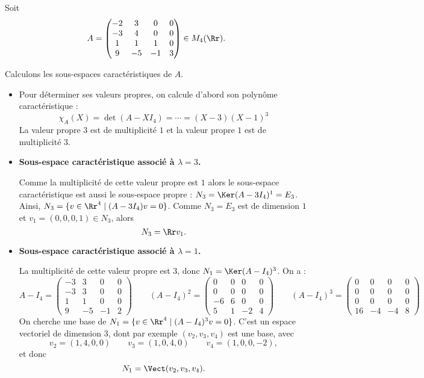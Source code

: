 \documentclass[12pt, class=report,crop=false]{standalone}
\begin{document}
\begin{exemple}
\label{ex:sscar}
Soit $$A = \begin{pmatrix}
-2 & 3 & 0 & 0 \\
-3 & 4 & 0 & 0 \\
1 & 1 & 1 & 0 \\
9 & -5 & -1 & 3
\end{pmatrix} \in M_4(\Rr).$$


Calculons les sous-espaces caractéristiques de $A$.
\begin{itemize}
  \item Pour déterminer ses valeurs propres, on calcule d'abord son polynôme caractéristique :
  $$\chi_A(X) = \det(A-X I_4) = \cdots = (X-3)(X-1)^3$$
  La valeur propre $3$ est de multiplicité $1$ et la valeur propre $1$ est de multiplicité $3$.
  
  \item \textbf{Sous-espace caractéristique associé à $\lambda=3$.}
  
  Comme la multiplicité de cette valeur propre est $1$ alors le sous-espace caractéristique est aussi le sous-espace propre : $N_3 = \Ker(A-3I_4)^1 = E_3$. 
  Ainsi, $N_3 = \{ v \in \Rr^4 \mid (A-3I_4)v = 0 \}$. 
  Comme $N_3=E_3$ est de dimension $1$ et $v_1=(0,0,0,1) \in N_3$, alors
  $$N_3 = \Rr v_1.$$
    
  
  \item \textbf{Sous-espace caractéristique associé à $\lambda=1$.}

   La multiplicité de cette valeur propre est $3$, donc
   $N_1 = \Ker (A-I_4)^3$. On a :
   $$A-I_4 = \begin{pmatrix}
-3 & 3 & 0 & 0 \\
-3 & 3 & 0 & 0 \\
1 & 1 & 0 & 0 \\
9 & -5 & -1 & 2
   \end{pmatrix}\qquad
   (A-I_4)^2 = \begin{pmatrix}
0 & 0 & 0 & 0 \\
0 & 0 & 0 & 0 \\
-6 & 6 & 0 & 0 \\
5 & 1 & -2 & 4   
   \end{pmatrix}\qquad
   (A-I_4)^3 = \begin{pmatrix}
0 & 0 & 0 & 0 \\
0 & 0 & 0 & 0 \\
0 & 0 & 0 & 0 \\
16 & -4 & -4 & 8   
   \end{pmatrix} 
$$ 
On cherche une base de $N_1 = \{ v \in \Rr^4 \mid (A-I_4)^3v = 0 \}$.
C'est un espace vectoriel de dimension $3$, dont par exemple $(v_2,v_3,v_4)$ est une base, avec
$$v_2 = (1,4,0,0) \qquad v_3 = (1,0,4,0) \qquad v_4 = (1,0,0,-2),$$
et donc 
$$N_1 = \Vect(v_2,v_3,v_4).$$
\end{itemize}
\end{exemple}
\end{document}
